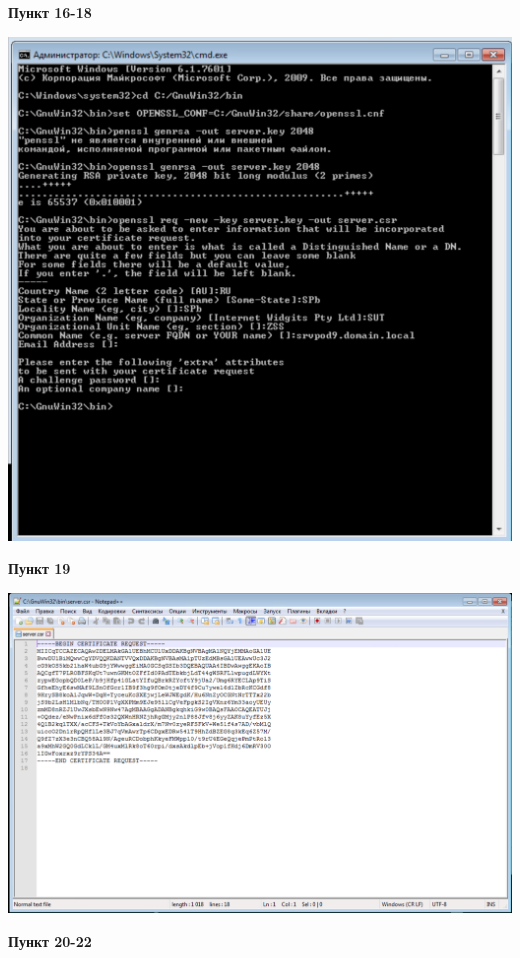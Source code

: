 \documentclass[a4paper,14pt]{extarticle}
\begin{document}
    \newpage
    \textbf{Пункт 16-18}
    \begin{center}
        \includegraphics[scale=0.6]{16-18}
    \end{center}
    \textbf{Пункт 19}
    \begin{center}
        \includegraphics[scale=0.5]{19}
    \end{center}
    \newpage
    \textbf{Пункт 20-22}
\end{document}
